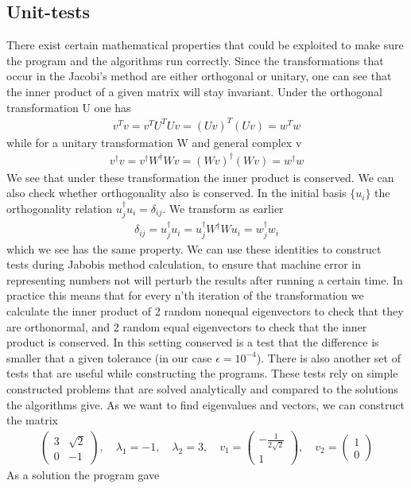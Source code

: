 \documentclass[a4paper,11pt]{article}
\begin{document}
{\subsection{Unit-tests}
There exist certain mathematical properties that could be exploited to make sure the program and the algorithms run correctly. Since the transformations that occur in the Jacobi's method are either orthogonal or unitary, one can see that the inner product of a given matrix will stay invariant. Under the orthogonal transformation U one has
\begin{align}
	v^{T}v = v^T U^T U v = (Uv)^T (Uv) = w^T w
\end{align}
while for a unitary transformation W and general complex v
\begin{align}
	v^\dagger v = v^\dagger W^\dagger W v = (Wv)^\dagger (Wv) = w^\dagger w
\end{align}
We see that under these transformation the inner product is conserved. We can also check whether orthogonality also is conserved. In the initial basis $\{u_i\}$ the orthogonality relation $u_j^\dagger u_i = \delta_{ij}$. We transform as earlier
\begin{align}
	 \delta_{ij}=u_j^\dagger u_i = u_j^\dagger W^\dagger W u_i = w_j^\dagger w_i
\end{align}
which we see has the same property. We can use these identities to construct tests during Jabobis method calculation, to ensure that machine error in representing numbers not will perturb the results after running a certain time. In practice this means that for every n'th iteration of the transformation we calculate the inner product of 2 random nonequal eigenvectors to check that they are orthonormal, and 2 random equal eigenvectors to check that the inner product is conserved. In this setting conserved is a test that the difference is smaller that a given tolerance (in our case $\epsilon = 10^{-4}$). There is also another set of tests that are useful while constructing the programs. These tests rely on simple constructed problems that are solved analytically and compared to the solutions the algorithms give. As we want to find eigenvalues and vectors, we can construct the matrix 
\begin{align}
\begin{pmatrix}
3 & \sqrt{2} \\
0 & -1 
\end{pmatrix}
, \quad \lambda_1 = -1, \quad \lambda_2 = 3, \quad v_1 = \begin{pmatrix}
-\frac{1}{2\sqrt{2}} \\
1
\end{pmatrix}, \quad v_2 = \begin{pmatrix}
1 \\
0
\end{pmatrix}
\end{align}
As a solution the program gave





}
\end{document}
